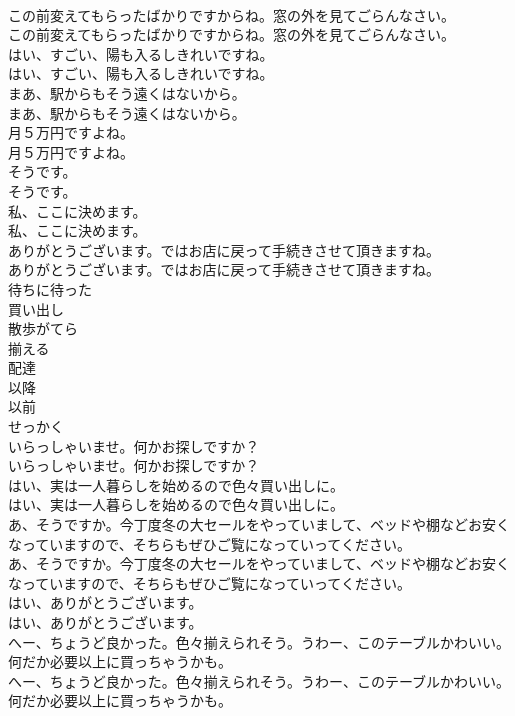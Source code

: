 \documentclass[8pt]{extreport}
\begin{document}
\begin{CJK}{UTF8}{min}
\\	この前変えてもらったばかりですからね。窓の外を見てごらんなさい。	
\\	この前変えてもらったばかりですからね。窓の外を見てごらんなさい。 
\\	はい、すごい、陽も入るしきれいですね。	
\\	はい、すごい、陽も入るしきれいですね。 
\\	まあ、駅からもそう遠くはないから。	
\\	まあ、駅からもそう遠くはないから。 
\\	月５万円ですよね。	
\\	月５万円ですよね。 
\\	そうです。	
\\	そうです。 
\\	私、ここに決めます。	
\\	私、ここに決めます。 
\\	ありがとうございます。ではお店に戻って手続きさせて頂きますね。	
\\	ありがとうございます。ではお店に戻って手続きさせて頂きますね。 
\\	待ちに待った
\\	買い出し
\\	散歩がてら
\\	揃える
\\	配達
\\	以降
\\	以前
\\	せっかく
\\	いらっしゃいませ。何かお探しですか？	
\\	いらっしゃいませ。何かお探しですか？ 
\\	はい、実は一人暮らしを始めるので色々買い出しに。	
\\	はい、実は一人暮らしを始めるので色々買い出しに。 
\\	あ、そうですか。今丁度冬の大セールをやっていまして、ベッドや棚などお安くなっていますので、そちらもぜひご覧になっていってください。	
\\	あ、そうですか。今丁度冬の大セールをやっていまして、ベッドや棚などお安くなっていますので、そちらもぜひご覧になっていってください。 
\\	はい、ありがとうございます。	
\\	はい、ありがとうございます。 
\\	へー、ちょうど良かった。色々揃えられそう。うわー、このテーブルかわいい。何だか必要以上に買っちゃうかも。	
\\	へー、ちょうど良かった。色々揃えられそう。うわー、このテーブルかわいい。何だか必要以上に買っちゃうかも。　　 

\end{CJK}
\end{document}
